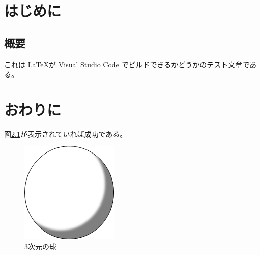 \documentclass{jsreport}
\begin{document}
\chapter{はじめに}
\section{概要}
これは \LaTeX が Visual Studio Code でビルドできるかどうかのテスト文章である\cite{example}。
\chapter{おわりに}
図\ref{fig:hs}が表示されていれば成功である。
\begin{figure}[tb]
    \centering
    \includegraphics[scale=1.0]{images/sample.png}
    \caption{3次元の球}\label{fig:hs}
\end{figure}


\end{document}

